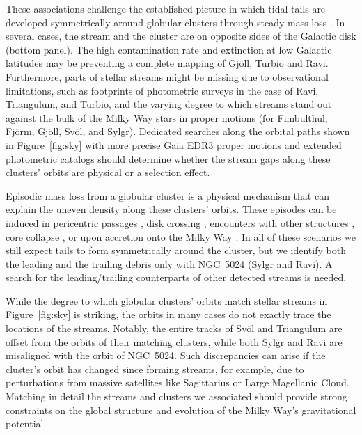 \documentclass[twocolumn]{aastex63}
\begin{document}
These associations challenge the established picture in which tidal tails are developed symmetrically around globular clusters through steady mass loss \citep[e.g.,][]{kuepper2010}.
In several cases, the stream and the cluster are on opposite sides of the Galactic disk (bottom panel).
The high contamination rate and extinction at low Galactic latitudes may be preventing a complete mapping of Gj\" oll, Turbio and Ravi.
Furthermore, parts of stellar streams might be missing due to observational limitations, such as footprints of photometric surveys in the case of Ravi, Triangulum, and Turbio, and the varying degree to which streams stand out against the bulk of the Milky Way stars in proper motions (for Fimbulthul, Fj\" orm, Gj\" oll, Sv\" ol, and Sylgr).
Dedicated searches along the orbital paths shown in Figure~\ref{fig:sky} with more precise Gaia EDR3 proper motions \citep{edr3} and extended photometric catalogs \citep{decals} should determine whether the stream gaps along these clusters' orbits are physical or a selection effect.

Episodic mass loss from a globular cluster is a physical mechanism that can explain the uneven density along these clusters' orbits.
These episodes can be induced in pericentric passages \citep{general_stripping_ref}, disk crossing \citep{dehnen2004}, encounters with other structures \citep{?}, core collapse \citep{?}, or upon accretion onto the Milky Way \citep{?}.
In all of these scenarios we still expect tails to form symmetrically around the cluster, but we identify both the leading and the trailing debris only with NGC~5024 (Sylgr and Ravi).
A search for the leading/trailing counterparts of other detected streams is needed.

While the degree to which globular clusters' orbits match stellar streams in Figure~\ref{fig:sky} is striking, the orbits in many cases do not exactly trace the locations of the streams.
Notably, the entire tracks of Sv\" ol and Triangulum are offset from the orbits of their matching clusters, while both Sylgr and Ravi are misaligned with the orbit of NGC~5024.
Such discrepancies can arise if the cluster's orbit has changed since forming streams, for example, due to perturbations from massive satellites like Sagittarius or Large Magellanic Cloud.
Matching in detail the streams and clusters we associated should provide strong constraints on the global structure and evolution of the Milky Way's gravitational potential.
\end{document}
